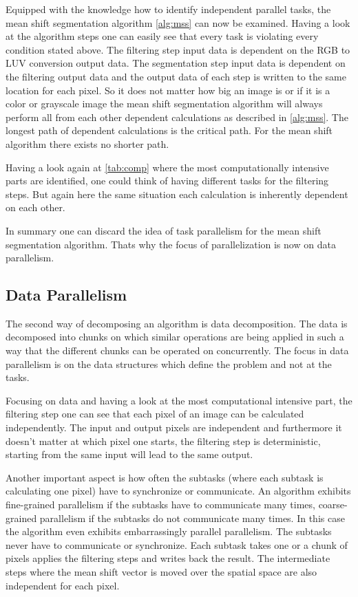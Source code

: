 Equipped with the knowledge how to identify independent parallel tasks, the 
mean shift segmentation algorithm \autoref{alg:mss} can now be examined. 
Having a look at the algorithm steps one can easily see that every task is 
violating every condition stated above. The filtering step input data is 
dependent on the \gls{RGB} to \gls{LUV} conversion output data. The segmentation
step input data is dependent on the filtering output data and the output data 
of each step is written to the same location for each pixel. So it does not matter
how big an image is or if it is a color or grayscale image the mean shift segmentation
algorithm will always perform all from each other dependent calculations as
described in \autoref{alg:mss}. The longest path of dependent calculations
is the critical path. For the mean shift algorithm there exists no shorter path. 

Having a look again at \autoref{tab:comp} where the most computationally 
intensive parts are identified, one could think of having different tasks for the
filtering steps. But again here the same situation each calculation is inherently 
dependent on each other. 

In summary one can discard the idea of task parallelism for the mean shift
segmentation algorithm. Thats why the focus of parallelization is now on data
parallelism.


\subsection{Data Parallelism} %
\label{sub:data_parallelism}
The second way of decomposing an algorithm is data decomposition. The data is
decomposed into chunks on which similar operations are being applied in such a
way that the different chunks can be operated on concurrently. The focus in data
parallelism is on the data structures which define the problem and not at the
tasks.

Focusing on data and having a look at the most computational intensive part, 
the filtering step one can see that each pixel of an image can be calculated 
independently. The input and output pixels are independent and furthermore it
doesn't matter at which pixel one starts, the filtering step is deterministic, 
starting from the same input will lead to the same output. 

Another important aspect is how often the subtasks (where each subtask is
calculating one pixel) have to synchronize or communicate. An algorithm exhibits
fine-grained parallelism if the subtasks have to communicate many times,
coarse-grained parallelism if the subtasks do not communicate many times. In
this case the algorithm even exhibits embarrassingly parallel parallelism. The
subtasks never have to communicate or synchronize. Each subtask takes one or a
chunk of pixels applies the filtering steps and writes back the result. The
intermediate steps where the mean shift vector is moved over the spatial space
are also independent for each pixel.

